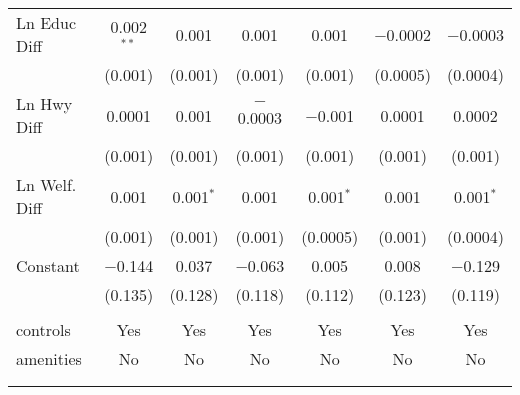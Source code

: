 \begin{table}[!htbp]
\begin{tabular}{@{\extracolsep{5pt}}lcccccc}
  Ln Educ Diff & 0.002$^{**}$ & 0.001 & 0.001 & 0.001 & $-$0.0002 & $-$0.0003 \\ 
  & (0.001) & (0.001) & (0.001) & (0.001) & (0.0005) & (0.0004) \\ 
  Ln Hwy Diff & 0.0001 & 0.001 & $-$0.0003 & $-$0.001 & 0.0001 & 0.0002 \\ 
  & (0.001) & (0.001) & (0.001) & (0.001) & (0.001) & (0.001) \\ 
  Ln Welf. Diff & 0.001 & 0.001$^{*}$ & 0.001 & 0.001$^{*}$ & 0.001 & 0.001$^{*}$ \\ 
  & (0.001) & (0.001) & (0.001) & (0.0005) & (0.001) & (0.0004) \\ 
  Constant & $-$0.144 & 0.037 & $-$0.063 & 0.005 & 0.008 & $-$0.129 \\ 
  & (0.135) & (0.128) & (0.118) & (0.112) & (0.123) & (0.119) \\ 
 \hline \\[-1.8ex] 
controls & Yes & Yes & Yes & Yes & Yes & Yes \\ 
amenities & No & No & No & No & No & No \\ 
\hline \\[-1.8ex] 
\hline 
\hline \\[-1.8ex] 
\end{tabular} 
\end{table} 
